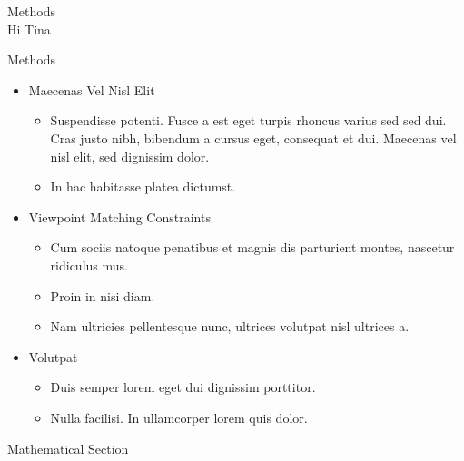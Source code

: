 \documentclass[final,hyperref={pdfpagelabels=false}]{beamer}
\begin{document}
\begin{frame}[t]
\begin{columns}[t]
\begin{column}{.465\textwidth}
\begin{block}{Methods}
	\\
	Hi Tina \\
	

\end{block}


\begin{block}{Methods}

\begin{itemize}
\item Maecenas Vel Nisl Elit
\begin{itemize}
\item Suspendisse potenti. Fusce a est eget turpis rhoncus varius sed sed dui. Cras justo nibh, bibendum a cursus eget, consequat et dui. Maecenas vel nisl elit, sed dignissim dolor. 
\item In hac habitasse platea dictumst.
\end{itemize}

\item Viewpoint Matching Constraints
\begin{itemize}
\item Cum sociis natoque penatibus et magnis dis parturient montes, nascetur ridiculus mus. 
\item Proin in nisi diam.
\item Nam ultricies pellentesque nunc, ultrices volutpat nisl ultrices a.
\end{itemize}

\item Volutpat 
\begin{itemize}
\item Duis semper lorem eget dui dignissim porttitor.
\item Nulla facilisi. In ullamcorper lorem quis dolor.
\end{itemize}
\end{itemize}

\end{block}


\begin{block}{Mathematical Section}


\end{block}
\end{column}
\end{columns}
\end{frame}
\end{document}

